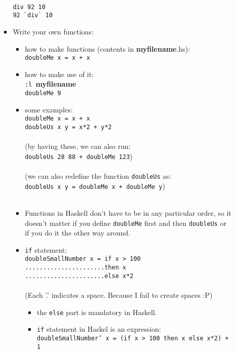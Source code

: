 \documentclass[a4paper,10pt]{article}
\begin{document}
\begin{enumerate}
\begin{enumerate}
\begin{itemize}
  \\\texttt{div 92 10}
  \\\texttt{92 \`{}div\`{} 10}
  \item Write your own functions:
  \begin{itemize}
   \item how to make functions (contents in \textbf{myfilename}.hs):
   \\\texttt{doubleMe x = x + x}
   \\\item how to make use of it:
   \\\texttt{:l }\textbf{myfilename}
   \\\texttt{doubleMe 9}
   \\\item some examples:
   \\\texttt{doubleMe x = x + x}
   \\\texttt{doubleUs x y = x*2 + y*2}
   \\\\(by having these, we can also run: 
   \\\texttt{doubleUs 28 88 + doubleMe 123})
   \\\\(we can also redefine the function \texttt{doubleUs} as:
   \\\texttt{doubleUs x y = doubleMe x + doubleMe y})
   \\\\\item Functions in Haskell don't have to be in any particular order, so it doesn't matter if you define \texttt{doubleMe} first and then \texttt{doubleUs} or if you do it the other way around.
   \\\item \texttt{if} statement:
   \\\texttt{doubleSmallNumber x = if x > 100}
   \\\texttt{......................then x}
   \\\texttt{......................else x*2}
   \\\\(Each '.' indicates a space. Because I fail to create spaces :P)\\
   \begin{itemize}
    \item the \texttt{else} part is mandatory in Haskell.
    \item \texttt{if} statement in Haskel is an expression:
    \\\texttt{doubleSmallNumber' x = (if x > 100 then x else x*2) + 1}

\end{itemize}
\end{itemize}
\end{itemize}
\end{enumerate}
\end{enumerate}
\end{document}
